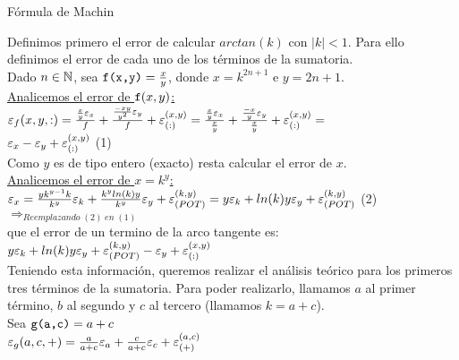 \begin{subsection}{Fórmula de Machin}

	\large
	
	Definimos primero el error de calcular $arctan(k)$ con $|k|<1$. Para ello definimos el error de cada uno de los términos de la sumatoria.\\
	
	Dado $n \in \mathbb{N}$, sea $\texttt{f(x,y)}=\frac{x}{y}$, donde $x=k^{2n+1}$ e $y=2n+1$.\\
	
	\underline{Analicemos el error de $\texttt{f}(x,y)$:}\\
	
	$\texttt{$\varepsilon _{f}({x,y,:})$}=\frac{\frac{x}{y}\varepsilon _{x}}{f} + \frac{\frac{-xy}{y^2}\varepsilon _{y}}{f} + \varepsilon _{({:})}^{({x,y})} = 
	\frac{\frac{x}{y}\varepsilon _{x}}{\frac{x}{y}} + \frac{\frac{-x}{y}\varepsilon _{y}}{\frac{x}{y}} + \varepsilon _{({:})}^{({x,y})} =$\\
	
	$\varepsilon _{x} - \varepsilon _{y} + \varepsilon _{({:})}^{({x,y})}$ (1)\\
	
	Como $y$ es de tipo entero (exacto) resta calcular el error de $x$.\\
	
	\underline{Analicemos el error de $x=k^y$:}\\
	
	$\texttt{$\varepsilon _{x}$}=\frac{yk^{y-1}k}{k^y}\varepsilon _{k}+\frac{k^y ln(k) y}{k^y}\varepsilon _{y} + \varepsilon _{({POT})}^{({k,y})} = y\varepsilon _{k} + ln(k) y\varepsilon _{y} + \varepsilon _{({POT})}^{({k,y})}$ (2)\\ 
	
	$\Rightarrow_{Reemplazando \; (2) \; en \; (1)}$\\
	
	que el error de un termino de la arco tangente es:\\
	
	$y\varepsilon _{k} + ln(k) y\varepsilon _{y} + \varepsilon _{({POT})}^{({k,y})} - \varepsilon _{y} + \varepsilon _{({:})}^{({x,y})}$\\
	
	Teniendo esta información, queremos realizar el análisis teórico para los primeros tres términos de la sumatoria. Para poder realizarlo, llamamos $a$ al primer término,
	$b$ al segundo y $c$ al tercero (llamamos $k=a+c$).\\
	
	Sea $\texttt{g(a,c)}=a+c$\\
	
	$\varepsilon _{g}({a,c,+}) = \frac{a}{a+c}\varepsilon _{a} + \frac{c}{a+c}\varepsilon _{c} + \varepsilon _{({+})}^{({a,c})}$\\
	

\end{subsection}
